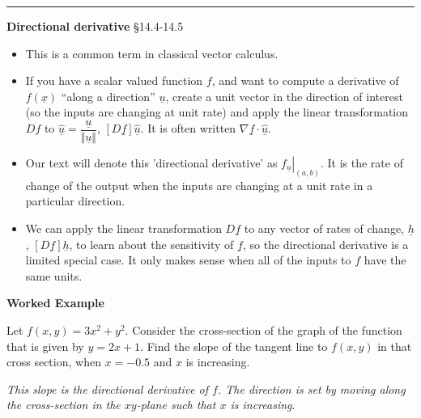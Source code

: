 \documentclass[12pt,letterpaper,noanswers]{exam}
\newcommand{\mb}[1]{\underline{#1}}
\begin{document}
\vspace{0.2cm}
\hrule
\vspace{0.2cm}


\noindent\textbf{Directional derivative} \S 14.4-14.5

\begin{tcolorbox}
\begin{itemize}
\itemsep0em
    \item This is a common term in classical vector calculus.
    \item If you have a scalar valued function $f$, and want to compute a derivative of $f(\mb{x})$ ``along a direction'' $\mb{u}$, create a unit vector in the direction of interest (so the inputs are changing at unit rate) and apply the linear transformation $Df$ to $\hat{\mb{u}} = \dfrac{\mb{u}}{\Vert\mb{u}\Vert}$, $[D\mb{f}]\hat{\mb{u}}$.  It is often written $\nabla \mb{f} \cdot \hat{\mb{u}}.$
    \item Our text will denote this 'directional derivative' as $\left.f_{\mb{ u}}\right\vert_{(a,b)}$.  It is the rate of change of the output when the inputs are changing at a unit rate in a particular direction.
    \item We can apply the linear transformation $D\mb{f}$ to any vector of rates of change, $\mb{h}$, $[D\mb{f}]\mb{h}$, to learn about the sensitivity of $\mb{f}$, so the directional derivative is a limited special case.  It only makes sense when all of the inputs to $f$ have the same units.
\end{itemize}
\end{tcolorbox}

\noindent\textbf{Worked Example}

Let $f(x,y) = 3x^2+y^2$.  Consider the cross-section of the graph of the function that is given by $y = 2x + 1$.  Find the slope of the tangent line to $f(x,y)$ in that cross section, when $x = -0.5$ and $x$ is increasing.  

\emph{This slope is the directional derivative of $f$.  The direction is set by moving along the cross-section in the $xy$-plane such that $x$ is increasing}.
\end{document}

